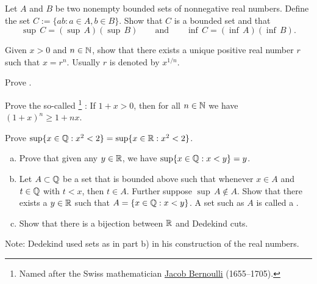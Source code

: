 \begin{exercise}
Let $A$ and $B$ be two nonempty bounded sets of nonnegative real numbers.
Define the set
$C := \{ ab : a \in A, b \in B \}$.
Show that $C$ is a bounded set and that
\begin{equation*}
\sup\,C = (\sup\,A )( \sup\,B) 
\qquad \text{and} \qquad
\inf\,C = (\inf\,A )( \inf\,B).
\end{equation*}
\end{exercise}

\begin{exercise}[Hard] \label{exercise:rootexistshard}
Given $x > 0$ and $n \in {\mathbb{N}}$, show that there exists a unique positive
real number $r$ such that $x = r^n$.  Usually $r$ is denoted by $x^{1/n}$.
\end{exercise}

\begin{exercise}[Easy]
Prove .
\end{exercise}

\begin{exercise} \label{exercise:bernoulliineq}
Prove the so-called \emph{}%
\footnote{%
Named after the Swiss mathematician
\href{https://en.wikipedia.org/wiki/Jacob_Bernoulli}{Jacob Bernoulli}
(1655--1705).}%
: If $1+x > 0$, then
for all $n \in {\mathbb{N}}$ we have $(1+x)^n \geq 1+nx$.
\end{exercise}

\begin{exercise} \label{exercise:sqrt2QorR}
Prove $\sup \{ x \in {\mathbb{Q}} : x^2 < 2 \} = \sup \{ x \in {\mathbb{R}} : x^2 < 2 \}$.
\end{exercise}

\begin{exercise} \label{exercise:Dedekind}
\leavevmode
\begin{enumerate}[a)]
\item
Prove that given any $y \in {\mathbb{R}}$, we have $\sup \{ x \in {\mathbb{Q}} : x < y \} = y$.
\item
Let $A \subset {\mathbb{Q}}$ be a set that is bounded above such that whenever $x
\in A$ and $t \in {\mathbb{Q}}$ with $t < x$, then $t \in A$.  Further suppose 
$\sup\, A \not\in A$.  Show that there exists a $y \in {\mathbb{R}}$ such that
$A = \{ x \in {\mathbb{Q}} : x < y \}$.  A set such as $A$ is called a
\emph{}.
\item
Show that there is a bijection between ${\mathbb{R}}$ and Dedekind cuts.
\end{enumerate}
Note: Dedekind used sets as in part b) in his construction of the
real numbers.
\end{exercise}

